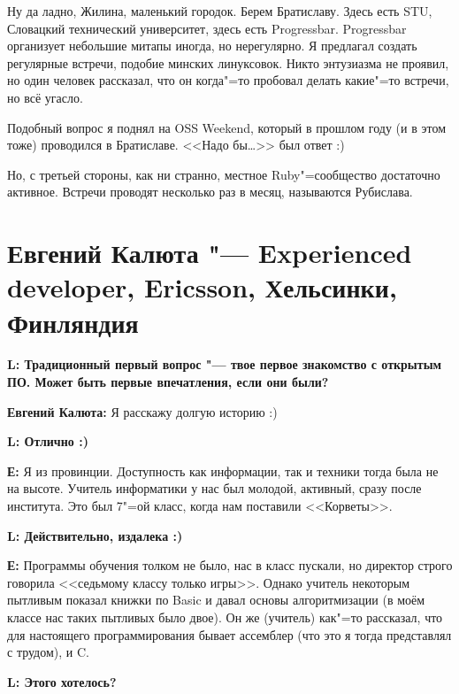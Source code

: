 \documentclass[10pt, a5paper]{article}
\begin{document}
Ну да ладно, Жилина, маленький городок. Берем Братиславу. Здесь есть STU, Словацкий технический университет, здесь есть Progressbar.  Progressbar организует небольшие митапы иногда, но нерегулярно. Я предлагал создать регулярные встречи, подобие минских линуксовок. Никто энтузиазма не проявил, но один человек рассказал, что он когда"=то пробовал делать какие"=то встречи, но всё угасло.

Подобный вопрос я поднял на OSS Weekend, который в прошлом году (и в этом тоже) проводился в Братиславе. <<Надо бы\ldots>> был ответ :)

Но, с третьей стороны, как ни странно, местное Ruby"=сообщество достаточно активное. Встречи проводят несколько раз в месяц, называются Рубислава.


\section[Евгений Калюта "--- Experienced developer, Ericsson, Хельсинки, Финляндия]{Евгений Калюта "--- Experienced develo\-per, Ericsson, Хельсинки, Финляндия}


{\noindent \bf L: Традиционный первый вопрос "--- твое первое знакомство с открытым ПО. Может быть первые впечатления, если они были?}

{\noindent \bf Евгений Калюта:} Я расскажу долгую историю :) 

{\noindent \bf L: Отлично :)}

{\noindent \bf Е:} Я из провинции. Доступность как информации, так и техники тогда была не на высоте. Учитель информатики у нас был молодой, активный, сразу после
института. Это был 7"=ой класс, когда нам поставили <<Корветы>>. 

{\noindent \bf L: Действительно, издалека :)}


{\noindent \bf Е:} Программы обучения толком не было, нас в класс пускали, но директор строго говорила
<<седьмому классу только игры>>. Однако учитель некоторым пытливым показал книжки по Basic и давал основы алгоритмизации (в моём классе нас таких пытливых было двое). Он же (учитель) как"=то рассказал, что для настоящего
программирования бывает ассемблер (что это я тогда представлял с трудом), и C.

{\noindent \bf L: Этого хотелось?}
\end{document}
